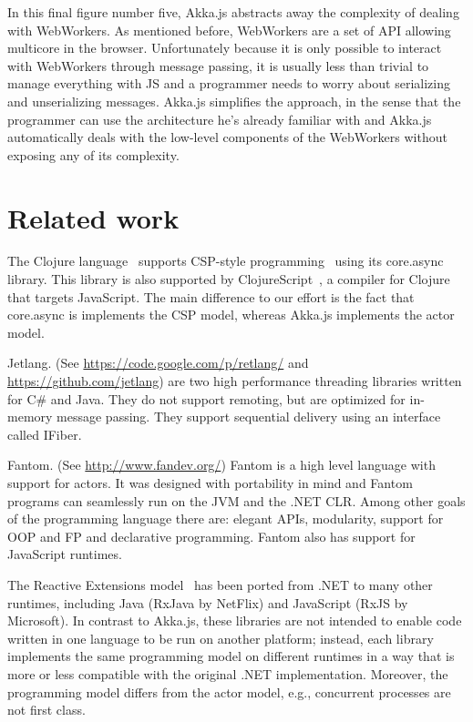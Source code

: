 \documentclass{sig-alternate}
\begin{document}
In this final figure number five, Akka.js abstracts away the complexity of dealing with WebWorkers. As mentioned before, WebWorkers
are a set of API allowing multicore in the browser. Unfortunately because it is only possible to interact with WebWorkers 
through message passing, it is usually less than trivial to manage everything with JS and a programmer needs to worry
about serializing and unserializing messages. Akka.js simplifies the approach, in the sense that the programmer can use
the architecture he's already familiar with and Akka.js automatically deals with the low-level components of the WebWorkers
without exposing any of its complexity.


\section{Related work}\label{sec:related}

The Clojure language~\cite{Halloway09} supports CSP-style programming~\cite{Hoare78} using its
core.async library. This library is also supported by
ClojureScript~\cite{ClojureScript}, a compiler for Clojure that targets
JavaScript. The main difference to our effort is the fact that core.async is
implements the CSP model, whereas Akka.js implements the actor model.

Jetlang. (See \url{https://code.google.com/p/retlang/} and \url{https://github.com/jetlang}) are two high performance threading libraries written for C\# and Java. They do not support remoting, but are optimized for in-memory message passing. They support sequential delivery using an interface called IFiber.

Fantom. (See \url{http://www.fandev.org/}) Fantom is a high level language with support for actors. It was designed with portability in mind and Fantom programs can seamlessly run on the JVM and the .NET CLR. Among other goals of the programming language there are: elegant APIs, modularity, support for OOP and FP and declarative programming. Fantom also has support for JavaScript runtimes.

The Reactive Extensions model~\cite{Meijer12} has been ported from .NET to
many other runtimes, including Java (RxJava by NetFlix) and JavaScript (RxJS
by Microsoft). In contrast to Akka.js, these libraries are not intended to
enable code written in one language to be run on another platform; instead,
each library implements the same programming model on different runtimes in a
way that is more or less compatible with the original .NET implementation.
Moreover, the programming model differs from the actor model, e.g., concurrent
processes are not first class.
\end{document}
